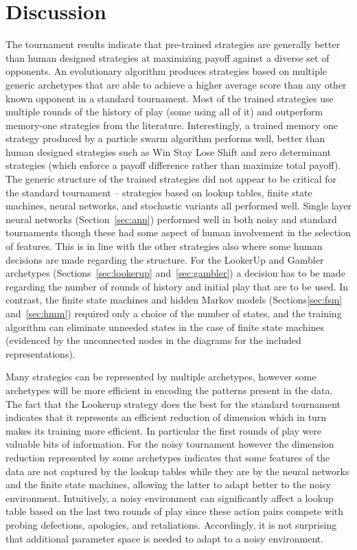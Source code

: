 \documentclass{article}
\begin{document}
\section{Discussion}

The tournament results indicate that pre-trained strategies are generally better
than human designed strategies at maximizing payoff against a diverse set of
opponents. An evolutionary algorithm produces strategies based on multiple
generic archetypes that are able to achieve a higher average
score than any other known opponent in a standard tournament. Most of the trained
strategies use multiple rounds of the history of play (some using all of it) and
outperform memory-one strategies from the literature. Interestingly, a trained
memory one strategy produced by a particle swarm algorithm performs well, better
than human designed strategies such as Win Stay Lose Shift and zero determinant
strategies (which enforce a payoff difference rather than maximize total payoff).
The generic structure of the trained strategies did not appear to be
critical for the standard tournament -- strategies based on lookup tables,
finite state machines, neural networks, and stochastic variants all performed well.
Single layer neural networks (Section~\ref{sec:ann}) performed well in both
noisy and standard tournaments
though these had some aspect of human involvement in the selection of features.
This is in line with the other strategies also where some human decisions are made
regarding the structure. For the LookerUp and Gambler archetypes
(Sections~\ref{sec:lookerup} and~\ref{sec:gambler})
a decision has to be made
regarding the number of rounds of history and initial play that are to be used.
In contrast, the finite state machines and hidden Markov models
(Sections\ref{sec:fsm} and~\ref{sec:hmm}) required only a choice of the number
of states, and the training algorithm can eliminate unneeded states in the case
of finite state machines (evidenced by the unconnected nodes in the diagrams
for the included representations).

Many strategies can be represented by multiple archetypes, however some
archetypes will be more efficient in encoding the patterns present in the data.
The fact that the Lookerup strategy does the best for the standard
tournament indicates that it represents an efficient reduction of
dimension which in turn makes its training more efficient. In particular the
first rounds of play were valuable bits of information. For the noisy
tournament however the dimension reduction represented by some archetypes
indicates that some features of the data are not captured by the lookup
tables while they are by the neural networks and the finite state machines,
allowing the latter to adapt better to the noisy environment. Intuitively, a noisy
environment can significantly affect a lookup table based on the last two rounds
of play since these action pairs compete with probing defections, apologies, and
retaliations. Accordingly, it is not surprising that additional parameter space
is needed to adapt to a noisy environment.
\end{document}
